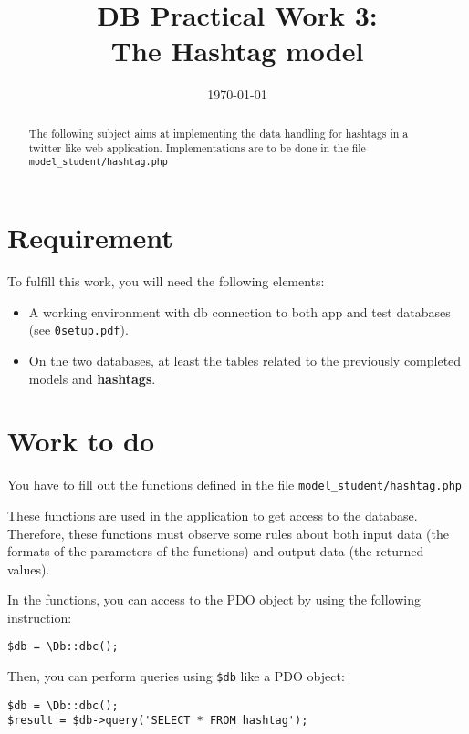 \documentclass[twoside,a4paper,12pt]{article}
\title{DB Practical Work 3:\\The Hashtag model}
\date{\today}
\begin{document}
\maketitle

\begin{abstract}
  The following subject aims at implementing the data handling for hashtags in a twitter-like web-application. Implementations are to be done in the file \texttt{model\_student/hashtag.php}
\end{abstract}

\tableofcontents

\clearpage

\section{Requirement}
To fulfill this work, you will need the following elements:

\begin{itemize}
\item A working environment with db connection to both app and test databases (see \texttt{0setup.pdf}).
\item On the two databases, at least the tables related to the previously completed models and \textbf{hashtags}.
\end{itemize}

\section{Work to do}
You have to fill out the functions defined in the file \texttt{model\_student/hashtag.php}

These functions are used in the application to get access to the database. Therefore, these functions must observe some rules about both input data (the formats of the parameters of the functions) and output data (the returned values).

In the functions, you can access to the PDO object by using the following instruction:

\begin{lstlisting}
$db = \Db::dbc();
\end{lstlisting}

Then, you can perform queries using \texttt{\$db} like a PDO object:
\begin{lstlisting}
$db = \Db::dbc();
$result = $db->query('SELECT * FROM hashtag');
\end{lstlisting}
\end{document}
